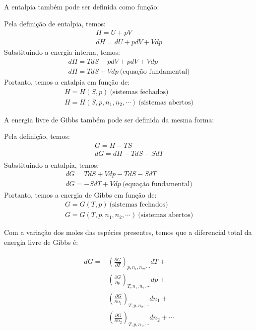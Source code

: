   A entalpia também pode ser definida como função:
  \begin{definition}
    Pela definição de entalpia, temos:
    \begin{gather}
      H = U + pV \\
      dH = dU + pdV + Vdp
    \end{gather}
    Substituindo a energia interna, temos:
    \begin{gather}
      dH = TdS - pdV + pdV + Vdp \\
      dH = TdS + Vdp \ \text{(equação fundamental)}
    \end{gather}
    Portanto, temos a entalpia em função de:
    \begin{gather}
      H = H(S,p) \ \text{(sistemas fechados)} \\
      H = H(S,p,n_1,n_2, \cdots) \ \text{(sistemas abertos)}
    \end{gather}
  \end{definition}

  A energia livre de Gibbs também pode ser definida da mesma forma:

  \begin{definition}
    Pela definição, temos:
    \begin{gather}
      G = H - TS \\
      dG = dH - TdS - SdT \\
    \end{gather}
    Substituindo a entalpia, temos:
    \begin{gather}
      dG = TdS + Vdp - TdS - SdT \\
      dG = -SdT + Vdp \ \text{(equação fundamental)}
    \end{gather}
    Portanto, temos a energia de Gibbs em função de:
    \begin{gather}
      G = G(T,p) \ \text{(sistemas fechados)} \\
      G = G(T,p,n_1,n_2,\cdots) \ \text{(sistemas abertos)}
    \end{gather}
  \end{definition}

  Com a variação dos moles das espécies presentes, temos que a diferencial total da energia livre de Gibbs é:
  \begin{definition}
    \begin{gather}
      \begin{align}
        dG = & \left( \frac{\partial G}{\partial T}  \right)_{p, n_1, n_2, \cdots} dT +          \\
             & \left( \frac{\partial G}{\partial p}  \right)_{T, n_1, n_2, \cdots} dp +          \\
             & \left( \frac{\partial G}{\partial n_1}  \right)_{T, p, n_2, \cdots} dn_1 +        \\
             & \left( \frac{\partial G}{\partial n_2}  \right)_{T, p, n_1, \cdots} dn_2 + \cdots
      \end{align}
    \end{gather}
  \end{definition}


